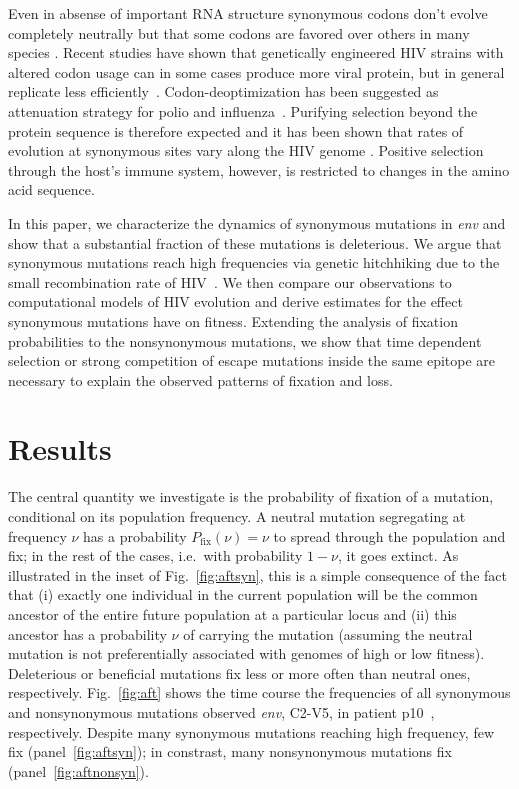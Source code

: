 \documentclass[rmp, twocolumn]{revtex4}
\newcommand{\FIG}[1]{Fig.~\ref{fig:#1}}
\newcommand{\env}{\textit{env}}
\begin{document}
Even in absense of important RNA structure synonymous codons don't evolve
completely neutrally but that some codons are favored over others in many
species \citep{plotkin_synonymous_2011}.  Recent studies have shown that
genetically engineered HIV strains with altered codon usage can in some cases
produce more viral protein, but in general replicate less
efficiently~\citep{ngumbela_quantitative_2008,
li_codon-usage-based_2012,keating_rich_2009}.  Codon-deoptimization has been
suggested as attenuation strategy for polio and
influenza~\citep{mueller_live_2010,coleman_virus_2008}. Purifying selection
beyond the protein sequence is therefore expected
\citep{forsdyke_reciprocal_1995,snoeck_mapping_2011} and it has been shown that
rates of evolution at synonymous sites vary along the HIV genome
\citep{mayrose_towards_2007}.  Positive selection through the host's immune
system, however, is restricted to changes in the amino acid sequence.

In this paper, we characterize the dynamics of synonymous mutations in \env{}
and show that a substantial fraction of these mutations is deleterious.
We argue that synonymous mutations reach high frequencies via genetic hitchhiking
due to the small recombination rate of HIV~\citep{neher_recombination_2010,
batorsky_estimate_2011}.
We then
compare our observations to computational models of HIV evolution and derive
estimates for the effect synonymous mutations have on fitness.
Extending the analysis of fixation probabilities to the
nonsynonymous mutations, we show that time dependent selection or strong
competition of escape mutations inside the same epitope are necessary to explain
the observed patterns of fixation and loss.

\section{Results}
The central quantity we investigate is the probability of fixation of a
mutation, conditional on its population frequency.  A neutral mutation
segregating at frequency $\nu$ has a probability $P_\text{fix}(\nu) = \nu$ to
spread through the population and fix; in the rest of the cases, i.e.~with
probability $1-\nu$, it goes extinct. As illustrated in the inset of \FIG{aftsyn},
this is a simple consequence of the fact that
(i) exactly one individual in the current population will be
the common ancestor of the entire future population at a particular locus and
(ii) this ancestor has a probability $\nu$ of carrying the mutation (assuming
the neutral mutation is not preferentially associated with genomes of high or
low fitness).
Deleterious or beneficial mutations fix less or
more often than neutral ones, respectively. \FIG{aft} shows 
the time course the frequencies of all synonymous and nonsynonymous mutations
observed \env, C2-V5, in patient p10~\citep{shankarappa_consistent_1999},
respectively. Despite many synonymous mutations reaching high frequency, 
few fix (panel~\ref{fig:aftsyn}); in constrast, many nonsynonymous mutations fix
(panel~\ref{fig:aftnonsyn}).
\end{document}
